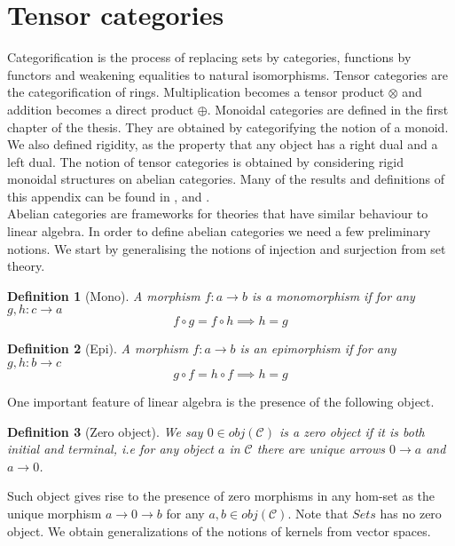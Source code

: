 \documentclass{article}
\newtheorem{definition}{Definition}
\newcommand{\cat}{\mathcal{C}}
\begin{document}
	\section{Tensor categories}
	Categorification is the process of replacing sets by categories, functions by functors and weakening equalities to natural isomorphisms. Tensor categories are the categorification of rings. Multiplication becomes a tensor product $\otimes$ and addition becomes a direct product $\oplus$. Monoidal categories are defined in the first chapter of the thesis. They are obtained by categorifying the notion of a monoid. We also defined rigidity, as the property that any object has a right dual and a left dual. The notion of tensor categories is obtained by considering rigid monoidal structures on abelian categories. Many of the results and definitions  of this appendix can be found in \cite{Etingof15}, \cite{Bartlett15} and \cite{Freyd66}.\\
	Abelian categories are frameworks for theories that have similar behaviour to linear algebra. In order to define abelian categories we need a few preliminary notions. We start by generalising the notions of injection and surjection from set theory.
	\begin{definition}[Mono]
		A morphism $f: a \rightarrow b$ is a monomorphism if for any $g,h: c \rightarrow a$
		$$f \circ g = f \circ h \implies h=g$$
	\end{definition}
	\begin{definition}[Epi]
		A morphism $f: a \rightarrow b$ is an epimorphism if for any $g,h: b \rightarrow c$
		$$g \circ f = h \circ f \implies h=g$$
	\end{definition}
	One important feature of linear algebra is the presence of the following object.
	\begin{definition}[Zero object]
		We say $0 \in obj(\cat)$ is a zero object if it is both initial and terminal, i.e for any object $a$ in $\cat$ there are unique arrows $0 \rightarrow a$ and $a \rightarrow 0$.
	\end{definition}
	Such object gives rise to the presence of zero morphisms in any hom-set as the unique morphism $a \rightarrow 0 \rightarrow b$ for any $a,b \in obj(\cat)$. Note that $Sets$ has no zero object. We obtain generalizations of the notions of kernels from vector spaces.
\end{document}
